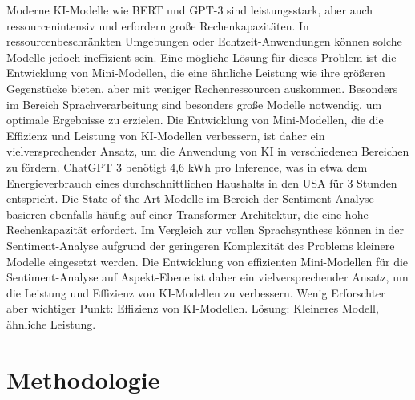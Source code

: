 \documentclass[12pt]{article}
\begin{document}
Moderne KI-Modelle wie BERT und GPT-3 sind leistungsstark, aber auch ressourcenintensiv und erfordern große Rechenkapazitäten. In ressourcenbeschränkten 
Umgebungen oder Echtzeit-Anwendungen können solche Modelle jedoch ineffizient sein. Eine mögliche Lösung für dieses Problem ist die Entwicklung von 
Mini-Modellen, die eine ähnliche Leistung wie ihre größeren Gegenstücke bieten, aber mit weniger Rechenressourcen auskommen.
\newline
\newline
Besonders im Bereich Sprachverarbeitung sind besonders große Modelle notwendig, um optimale Ergebnisse zu erzielen. Die Entwicklung von Mini-Modellen, 
die die Effizienz und Leistung von KI-Modellen verbessern, ist daher ein vielversprechender Ansatz, um die Anwendung von KI in verschiedenen Bereichen 
zu fördern. 
\newline
\newline
ChatGPT 3 benötigt 4,6 kWh pro Inference, was in etwa dem Energieverbrauch eines durchschnittlichen Haushalts in den USA für 3 Stunden entspricht. 
Die State-of-the-Art-Modelle im Bereich der Sentiment Analyse basieren ebenfalls häufig auf einer Transformer-Architektur, die eine hohe Rechenkapazität erfordert.
\newline
\newline
Im Vergleich zur vollen Sprachsynthese können in der Sentiment-Analyse aufgrund der geringeren Komplexität des Problems kleinere Modelle eingesetzt werden. 
Die Entwicklung von effizienten Mini-Modellen für die Sentiment-Analyse auf Aspekt-Ebene ist daher ein vielversprechender Ansatz,
um die Leistung und Effizienz von KI-Modellen zu verbessern.
\newline
\newline
Wenig Erforschter aber wichtiger Punkt: Effizienz von KI-Modellen. Lösung: Kleineres Modell, ähnliche Leistung.

\section{Methodologie}
\end{document}
